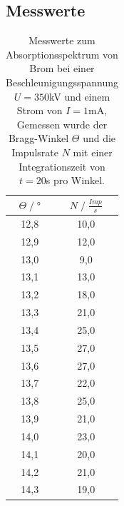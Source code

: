 \subsection{Messwerte}
\begin{table}[H]
    \centering
    \begin{tabular}{c c}
        \toprule
        $\Theta\;/\;°$& $N\;/\;\frac{Imp}{s}$\\
        \midrule
        12,8&	10,0\\
        12,9&	12,0\\
        13,0&	9,0\\
        13,1&	13,0\\
        13,2&	18,0\\
        13,3&	21,0\\
        13,4&	25,0\\
        13,5&	27,0\\
        13,6&	27,0\\
        13,7&	22,0\\
        13,8&	25,0\\
        13,9&	21,0\\
        14,0&	23,0\\
        14,1&	20,0\\
        14,2&	21,0\\
        14,3&	19,0\\
        \bottomrule
    \end{tabular}
    \caption{Messwerte zum Absorptionsspektrum von Brom bei einer Beschleunigungsspannung 
    $U=350$kV und einem Strom von $I=1$mA,\\
    Gemessen wurde der Bragg-Winkel $\Theta$ und die Impulsrate $N$ mit einer Integrationszeit
    von $t=20$s pro Winkel.}
\end{table}

